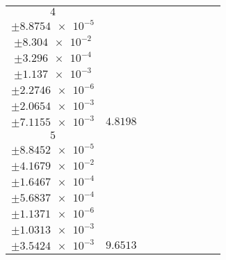 \documentclass[8pt]{article}
\begin{document}
\begin{longtable}[l]{c c c c c c c c c}
$\num{4}$ & \begin{tabular}[c]{@{}c@{}}$\num{6.1488e-2}$ \\ $\pm\num{8.8754e-5}$\end{tabular} & \begin{tabular}[c]{@{}c@{}}$\num{0.18593}$ \\ $\pm\num{8.304e-2}$\end{tabular} & \begin{tabular}[c]{@{}c@{}}$\num{12.903}$ \\ $\pm\num{3.296e-4}$\end{tabular} & \begin{tabular}[c]{@{}c@{}}$\num{1.3471e+3}$ \\ $\pm\num{1.137e-3}$\end{tabular} & \begin{tabular}[c]{@{}c@{}}$\num{2.695}$ \\ $\pm\num{2.2746e-6}$\end{tabular} & \begin{tabular}[c]{@{}c@{}}$\num{1.1793}$ \\ $\pm\num{2.0654e-3}$\end{tabular} & \begin{tabular}[c]{@{}c@{}}$\num{4.2554}$ \\ $\pm\num{7.1155e-3}$\end{tabular} & $\num{4.8198}$\\
$\num{5}$ & \begin{tabular}[c]{@{}c@{}}$\num{0.12229}$ \\ $\pm\num{8.8452e-5}$\end{tabular} & \begin{tabular}[c]{@{}c@{}}$\num{-0.35689}$ \\ $\pm\num{4.1679e-2}$\end{tabular} & \begin{tabular}[c]{@{}c@{}}$\num{-7.3992}$ \\ $\pm\num{1.6467e-4}$\end{tabular} & \begin{tabular}[c]{@{}c@{}}$\num{1.3645e+3}$ \\ $\pm\num{5.6837e-4}$\end{tabular} & \begin{tabular}[c]{@{}c@{}}$\num{2.7298}$ \\ $\pm\num{1.1371e-6}$\end{tabular} & \begin{tabular}[c]{@{}c@{}}$\num{1.1748}$ \\ $\pm\num{1.0313e-3}$\end{tabular} & \begin{tabular}[c]{@{}c@{}}$\num{4.2365}$ \\ $\pm\num{3.5424e-3}$\end{tabular} & $\num{9.6513}$\\

\end{longtable}
\end{document}
